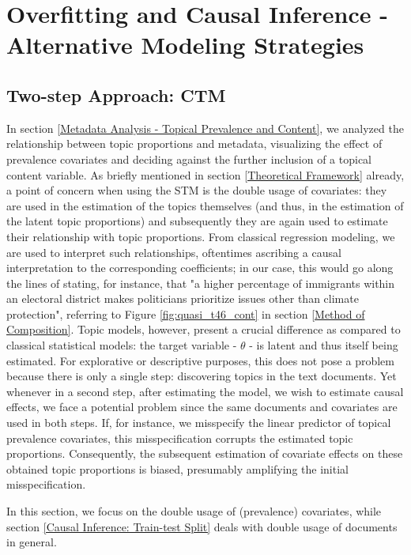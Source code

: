\section{Overfitting and Causal Inference - Alternative Modeling Strategies}
\label{Overfitting and Causal Inference - Alternative Modeling Strategies}

\subsection{Two-step Approach: CTM}
\label{Two-step Approach: CTM}

In section \ref{Metadata Analysis - Topical Prevalence and Content}, we analyzed the relationship between topic proportions and metadata, visualizing the effect of prevalence covariates and deciding against the further inclusion of a topical content variable. As briefly mentioned in section \ref{Theoretical Framework} already, a point of concern when using the STM is the double usage of covariates: they are used in the estimation of the topics themselves (and thus, in the estimation of the latent topic proportions) and subsequently they are again used to estimate their relationship with topic proportions. From classical regression modeling, we are used to interpret such relationships, oftentimes ascribing a causal interpretation to the corresponding coefficients; in our case, this would go along the lines of stating, for instance, that "a higher percentage of immigrants within an electoral district makes politicians prioritize issues other than climate protection", referring to Figure \ref{fig:quasi_t46_cont} in section \ref{Method of Composition}. Topic models, however, present a crucial difference as compared to classical statistical models: the target variable - $\theta$ - is latent and thus itself being estimated. For explorative or descriptive purposes, this does not pose a problem because there is only a single step: discovering topics in the text documents. Yet whenever in a second step, after estimating the model, we wish to estimate causal effects, we face a potential problem since the same documents and covariates are used in both steps. If, for instance, we misspecify the linear predictor of topical prevalence covariates, this misspecification corrupts the estimated topic proportions. Consequently, the subsequent estimation of covariate effects on these obtained topic proportions is biased, presumably amplifying the initial misspecification.


In this section, we focus on the double usage of (prevalence) covariates, while section \ref{Causal Inference: Train-test Split} deals with double usage of documents in general.

